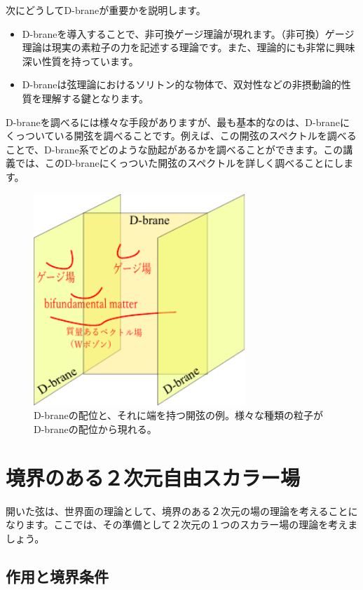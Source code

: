 \documentclass[report,paper=a4, fontsize=12pt, line_length=16cm, number_of_lines=33,dvipdfmx]{jlreq}
\numberwithin{equation}{chapter}
\numberwithin{equation}{section}
\begin{document}
次にどうしてD-braneが重要かを説明します。
\begin{itemize}
  \item D-braneを導入することで、非可換ゲージ理論が現れます。（非可換）ゲージ理論は現実の素粒子の力を記述する理論です。また、理論的にも非常に興味深い性質を持っています。
  \item D-braneは弦理論におけるソリトン的な物体で、双対性などの非摂動論的性質を理解する鍵となります。
\end{itemize}

D-braneを調べるには様々な手段がありますが、最も基本的なのは、D-braneにくっついている開弦を調べることです。例えば、この開弦のスペクトルを調べることで、D-brane系でどのような励起があるかを調べることができます。この講義では、このD-braneにくっついた開弦のスペクトルを詳しく調べることにします。

\begin{figure}
  \centering
  \includegraphics[width=8cm]{generalbrane.pdf}
  \caption{D-braneの配位と、それに端を持つ開弦の例。様々な種類の粒子がD-braneの配位から現れる。}
\end{figure}


\section{境界のある２次元自由スカラー場}

開いた弦は、世界面の理論として、境界のある２次元の場の理論を考えることになります。ここでは、その準備として２次元の１つのスカラー場の理論を考えましょう。

\subsection{作用と境界条件}
\end{document}
